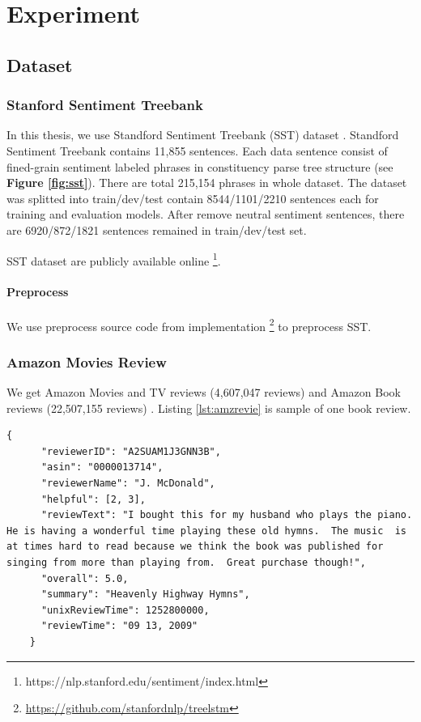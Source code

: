 \chapter{Experiment}

\section{Dataset}

\subsection{Stanford Sentiment Treebank}
In this thesis, we use Standford Sentiment Treebank (SST) dataset \cite{socher2013recursive}. Standford Sentiment Treebank contains 11,855 sentences. Each data sentence consist of fined-grain sentiment labeled phrases in constituency parse tree structure (see \textbf{Figure \ref{fig:sst}}). There are total 215,154 phrases in whole dataset.
The dataset was splitted into train/dev/test contain 8544/1101/2210 sentences each for training and evaluation models. After remove neutral sentiment sentences, there are 6920/872/1821 sentences remained in train/dev/test set.

SST dataset are publicly available online \footnote{https://nlp.stanford.edu/sentiment/index.html}.

\subsubsection{Preprocess}
We use preprocess source code from \cite{socher2013recursive} implementation \footnote{\url{https://github.com/stanfordnlp/treelstm}} to preprocess SST.



\subsection{Amazon Movies Review}
We get Amazon Movies and TV reviews (4,607,047 reviews) and Amazon Book reviews (22,507,155 reviews) \cite{he2016ups}. Listing \ref{lst:amzrevie} is sample of one book review.

\begin{lstlisting}[caption={Amazon reviews sample},label={lst:amzreview}]
	{
	  "reviewerID": "A2SUAM1J3GNN3B",
	  "asin": "0000013714",
	  "reviewerName": "J. McDonald",
	  "helpful": [2, 3],
	  "reviewText": "I bought this for my husband who plays the piano.  He is having a wonderful time playing these old hymns.  The music  is at times hard to read because we think the book was published for singing from more than playing from.  Great purchase though!",
	  "overall": 5.0,
	  "summary": "Heavenly Highway Hymns",
	  "unixReviewTime": 1252800000,
	  "reviewTime": "09 13, 2009"
	}
\end{lstlisting}

